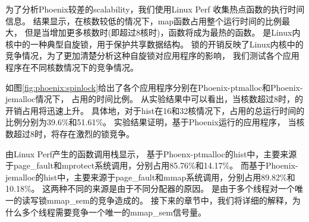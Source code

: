为了分析Phoenix较差的scalability，我们使用Linux Perf\cite{de2009performance}
收集热点函数的执行时间信息。
结果显示，在核数较低的情况下，map函数占用整个运行时间的比例最大，
但是当增加更多核数时(即超过8核时)，\lock 函数将成为最热的函数。
\lock 是Linux内核中的一种典型自旋锁，用于保护共享数据结构。
锁的开销反映了Linux内核中的竞争情况，为了更加清楚分析这种自旋锁\lock 对应用程序的影响，
我们测试各个应用程序在不同核数情况下的竞争情况。

如图\ref{fig:phoenix:spinlock}给出了各个应用程序分别在Phoenix-ptmalloc和Phoenix-jemalloc情况下，
\lock 占用的时间比例。
从实验结果中可以看出，当核数超过8时，\lock 的开销占用将迅速上升。
具体地，对于hist在16和32核情况下，\lock 占用的总运行时间的比例分别为39.6\%和51.61\%。
实验结果证明，基于Phoenix运行的应用程序，
当核数超过8时，将存在激烈的锁竞争。

由Linux Perf产生的函数调用栈显示，
基于Phoenx-ptmalloc的hist中，\lock 主要来源于page\_fault和mprotect系统调用，分别占用85.76\%和14.17\%。
而基于Phoenix-jemalloc的hist中，\lock 主要来源于page\_fault和mmap系统调用，分别占用89.82\%和10.18\%。
这两种不同的来源是由于不同分配器的原因。
\lock 是由于多个线程对一个唯一的读写锁mmap\_sem的竞争造成的。
接下来的章节中，我们将详细的解释，为什么多个线程需要竞争一个唯一的mmap\_sem信号量。

